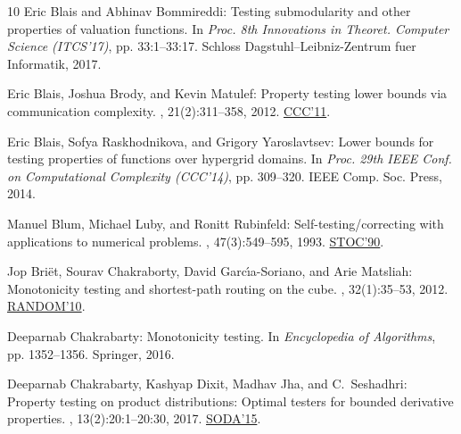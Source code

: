 \documentclass[11pt]{article}
\numberwithin{equation}{section}
\theoremstyle{definition}
\theoremstyle{plain}
\begin{document}
\begin{thebibliography}{10}
{\sc Eric Blais and Abhinav Bommireddi}: Testing submodularity and other
  properties of valuation functions.
\newblock In {\em Proc. 8th Innovations in Theoret. Computer Science
  (ITCS'17)}, pp. 33:1--33:17. Schloss Dagstuhl--Leibniz-Zentrum fuer
  Informatik, 2017.

{\sc Eric Blais, Joshua Brody, and Kevin Matulef}: Property testing lower
  bounds via communication complexity.
, 21(2):311--358, 2012.
\newblock \prelim \href{http://doi.org/10.1109/CCC.2011.31}{CCC'11}.
\newblock [\epfmtdoi{10.1007/s00037-012-0040-x}]

{\sc Eric Blais, Sofya Raskhodnikova, and Grigory Yaroslavtsev}: Lower bounds
  for testing properties of functions over hypergrid domains.
\newblock In {\em Proc. 29th IEEE Conf. on Computational Complexity (CCC'14)},
  pp. 309--320. IEEE Comp. Soc. Press, 2014.

{\sc Manuel Blum, Michael Luby, and Ronitt Rubinfeld}: Self-testing/correcting
  with applications to numerical problems.
, 47(3):549--595, 1993.
\newblock \prelim \href{https://doi.org/10.1145/100216.100225}{STOC'90}.
\newblock [\epfmtdoi{10.1016/0022-0000(93)90044-W}]

{\sc Jop Bri{\"{e}}t, Sourav Chakraborty, David Garc{\'{\i}}a{-}Soriano, and
  Arie Matsliah}: Monotonicity testing and shortest-path routing on the cube.
, 32(1):35--53, 2012.
\newblock \prelim
  \href{https://doi.org/10.1007/978-3-642-15369-3\_35}{RANDOM'10}.
\newblock [\epfmtdoi{10.1007/s00493-012-2765-1}]

{\sc Deeparnab Chakrabarty}: Monotonicity testing.
\newblock In {\em Encyclopedia of Algorithms}, pp. 1352--1356. Springer, 2016.
\newblock [\epfmtdoi{10.1007/978-1-4939-2864-4\_699}]

{\sc Deeparnab Chakrabarty, Kashyap Dixit, Madhav Jha, and C.~Seshadhri}:
  Property testing on product distributions: Optimal testers for bounded
  derivative properties.
, 13(2):20:1--20:30, 2017.
\newblock \prelim \href{https://doi.org/10.1137/1.9781611973730.121}{SODA'15}.


\end{thebibliography}
\end{document}
